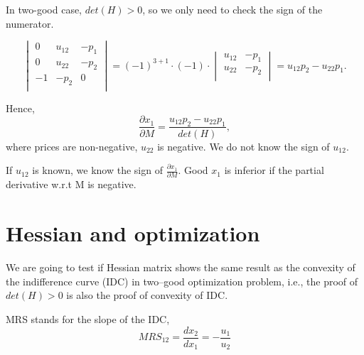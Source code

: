 \documentclass[12pt]{article}
\begin{document}
In two-good case, $ det(H) > 0 $, so we only need to check the sign of 
the numerator.

\begin{equation}
				\begin{vmatrix}
								0 &u_{12} &-p_1\\
								0 &u_{22} &-p_2\\
								-1 &-p_2 &0\\
				\end{vmatrix} = 
				(-1)^{3+1}\cdot (-1)\cdot 
				\begin{vmatrix}
								u_{12} &-p_1\\
								u_{22} &-p_2\\
				\end{vmatrix}
				= u_{12}p_2 - u_{22}p_1.
\end{equation}

Hence,
\begin{equation}
				\frac{\partial x_1 }{\partial M  } = \frac{u_{12}p_2 - u_{22}p_1}{
				det(H)},
\end{equation}
where prices are non-negative, $ u_{22} $ is negative. We do not know the sign
of $ u_{12} $.

If $ u_{12} $ is known, we know the sign of $ \frac{\partial x_1 }{\partial M} $.
Good $ x_1 $ is inferior if the partial derivative w.r.t M is negative.



\section{Hessian and optimization}

We are going to test if Hessian matrix shows the same result as the convexity
of the indifference curve (IDC) in two--good optimization problem, i.e., 
the proof of $ det(H) > 0 $ is also the proof of convexity of IDC.

MRS stands for the slope of the IDC, 
\begin{equation}
				MRS_{12} = \frac{dx_2}{dx_1} = -\frac{u_1}{u_2}
\end{equation}
\end{document}
